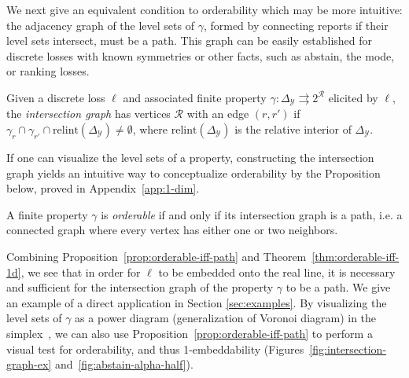 \documentclass[anon]{colt2020} %
\newcommand{\relint}{\mathrm{relint}}
\newcommand{\simplex}{\Delta_\Y}
\newcommand{\R}{\mathcal{R}}
\newcommand{\Y}{\mathcal{Y}}
\newcommand{\toto}{\rightrightarrows}
\begin{document}
We next give an equivalent condition to orderability which may be more intuitive: the adjacency graph of the level sets of $\gamma$, formed by connecting reports if their level sets intersect, must be a path.
This graph can be easily established for discrete losses with known symmetries or other facts, such as abstain, the mode, or ranking losses.

\begin{definition}\label{def:intersection-graph}
  Given a discrete loss $\ell$ and associated finite property $\gamma: \simplex \toto 2^{\R}$ elicited by $\ell$, the \emph{intersection graph} has vertices $\R$ with an edge $(r,r')$ if $\gamma_r \cap \gamma_{r'} \cap \relint(\simplex) \neq \emptyset$, where $\relint(\simplex)$ is the relative interior of $\simplex$.
\end{definition}

If one can visualize the level sets of a property, constructing the intersection graph yields an intuitive way to conceptualize orderability by the Proposition below, proved in Appendix~\ref{app:1-dim}.

\begin{proposition} \label{prop:orderable-iff-path}
  A finite property $\gamma$ is \emph{orderable} if and only if its intersection graph is a path, i.e. a connected graph where every vertex has either one or two neighbors.
\end{proposition}


Combining Proposition~\ref{prop:orderable-iff-path} and Theorem~\ref{thm:orderable-iff-1d}, we see that in order for $\ell$ to be embedded onto the real line, it is necessary and sufficient for the intersection graph of the property $\gamma$ to be a path.
We give an example of a direct application in Section \ref{sec:examples}.
By visualizing the level sets of $\gamma$ as a power diagram (generalization of Voronoi diagram) in the simplex~\cite{lambert2009eliciting}, we can also use Proposition~\ref{prop:orderable-iff-path} to perform a visual test for orderability, and thus 1-embeddability (Figures~\ref{fig:intersection-graph-ex} and~\ref{fig:abstain-alpha-half}).
\end{document}
